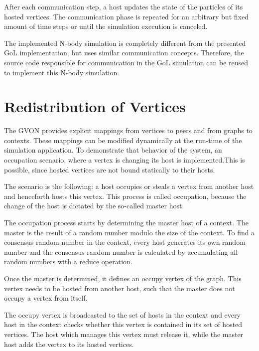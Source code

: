 \noindent After each communication step, a host updates the state of
the particles of its hosted vertices.  The communication phase is
repeated for an arbitrary but fixed amount of time steps or until the simulation
execution is canceled.

The implemented N-body simulation is completely different from the
presented GoL implementation, but uses similar communication
concepts. Therefore, the source code responsible for communication in
the GoL simulation can be reused to implement this N-body simulation.



\section{Redistribution of Vertices}

The GVON provides explicit mappings from vertices to peers and from
graphs to contexts. These mappings can be modified dynamically at the
run-time of the simulation application.  To demonstrate that behavior
of the system, an occupation scenario, where a vertex is changing its
host is implemented.This is possible, since hosted vertices are not
bound statically to their hosts.

The scenario is the following: a host occupies or steals a vertex
from another host and henceforth hosts this vertex.  This process
is called occupation, because the change of the host is
dictated by the so-called master host.

The occupation process starts by determining the master host of a
context. The master is the result of a random number modulo the size
of the context. To find a consensus random number in the context,
every host generates its own random number and the consensus random
number is calculated by accumulating all random numbers with a
reduce operation.

Once the master is determined, it defines an occupy vertex of the
graph. This vertex needs to be hosted from another host, such that the
master does not occupy a vertex from itself.

The occupy vertex is broadcasted to the set of hosts in the context
and every host in the context checks whether this vertex is contained
in its set of hosted vertices. The host which manages this vertex must
release it, while the master host adds the vertex to its hosted
vertices.

